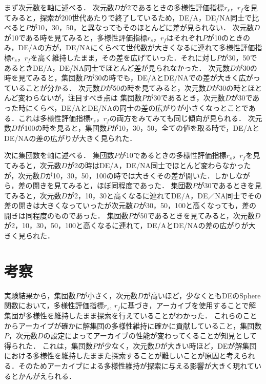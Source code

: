 \documentclass[a4paper,11pt,oneside,openany]{jsbook}
\begin{document}
まず次元数を軸に述べる．
次元数$D$が2であるときの多様性評価指標$r_s$，$r_f$を見てみると，探索が200世代あたりで終了しているため，DE/A，DE/NA同士で比べると$P$が10，30，50，と異なってもそのほとんどに差が見られない．
次元数$D$が10である時を見てみると，多様性評価指標$r_s$，$r_f$はそれぞれ$P$が10のときのみ，DE/Aの方が，DE/NAにくらべて世代数が大きくなるに連れて多様性評価指標$r_s$，$r_f$を高く維持したまま，その差を広げていった．それに対し$P$が30，50であるときDE/A，DE/NA同士でほとんど差が見られなかった．
次元数$D$が30の時を見てみると，集団数$P$が30の時でも，DE/AとDE/NAでの差が大きく広がっていることが分かる．
次元数$D$が50の時を見てみると，次元数$D$が30の時とほとんど変わらないが，注目すべき点は
集団数$P$が30であるとき，次元数$D$が30であった時にくらべ，DE/AとDE/NAの同士の差の広がりが小さくなっとことである．これは多様性評価指標$r_s$，$r_f$の両方をみてみても同じ傾向が見られる．
次元数$D$が100の時を見ると，集団数$P$が10，30，50，全ての値を取る時で，DE/AとDE/NAの差の広がりが大きく見られた．

次に集団数を軸に述べる．
集団数$P$が10であるときの多様性評価指標$r_s$，$r_f$を見てみると，次元数$D$が2の時はDE/A，DE/NA同士でほとんど変わらなかったが，次元数$D$が10，30，50，100の時では大きくその差が開いた．しかしながら，差の開きを見てみると，ほぼ同程度であった．
集団数$P$が30であるときを見てみると，次元数$D$が2，10，30と高くなるに連れてDE/A，DE／NA同士でその差の開きは大きくなっていったが次元数$D$が30，50，100と高くなっても，差の開きは同程度のものであった．
集団数$P$が50であるときを見てみると，次元数$D$が2，10，30，50，100と高くなるに連れて，DE/AとDE/NAの差の広がりが大きく見られた．


\section{考察}
実験結果から，集団数$P$が小さく，次元数$D$が高いほど，少なくともDEのSphere関数において，多様性評価指標$r_s$, $r_f$に基づき，アーカイブを使用することで解集団が多様性を維持したまま探索を行えていることがわかった．
これらのことからアーカイブが確かに解集団の多様性維持に確かに貢献していること，集団数$P$，次元数$D$の設定によってアーカイブの性能が変わってくることが知見として得られた．
これは，集団数$P$が少なく，次元数$D$が大きい時ほど，DEが解集団における多様性を維持したままた探索することが難しいことが原因と考えられる．そのためアーカイブによる多様性維持が探索に与える影響が大きく現れているとかんがえられる．
\end{document}
